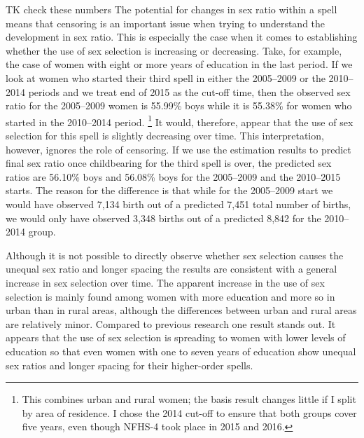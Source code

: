 \documentclass[12pt,letterpaper]{article}
\begin{document}
TK check these numbers
The potential for changes in sex ratio within a spell means
that censoring is an important issue when trying to understand the development
in sex ratio.
This is especially the case when it comes to establishing whether 
the use of sex selection is increasing or decreasing.
Take, for example, the case of women with eight or more years of
education in the last period. 
If we look at women who started their third spell in either the
2005--2009 or the 2010--2014 periods and we treat end of 2015
as the cut-off time, then the observed sex ratio for the 2005--2009
women is 55.99\% boys while it is 55.38\% for women who started 
in the 2010--2014 period.%
\footnote{
This combines urban and rural women; the basis result 
changes little if I split by area of residence.
I chose the 2014 cut-off to ensure that both groups cover 
five years, even though NFHS-4 took place in 2015 and 2016.
}
It would, therefore, appear that the use of sex selection for
this spell is slightly decreasing over time.
This interpretation, however, ignores the role of censoring.
If we use the estimation results to predict final sex ratio
once childbearing for the third spell is over, the predicted
sex ratios are 56.10\% boys and 56.08\% boys for the 
2005--2009 and the 2010--2015 starts.
The reason for the difference is that while for the 
2005--2009 start we would have observed 7,134 birth out
of a predicted 7,451 total number of births, we would
only have observed 3,348 births out of a predicted 8,842
for the 2010--2014 group.

Although it is not possible to directly observe whether sex selection
causes the unequal sex ratio and longer spacing the results are
consistent with a general increase in sex selection over time. 
The apparent increase in the use of sex selection is mainly found among
women with more education and more so in urban than in rural areas,
although the differences between urban and rural areas are relatively
minor. 
Compared to previous research one result stands out. 
It appears that the use of sex selection is spreading to women with lower 
levels of education so that even women with one to seven years of 
education show unequal sex ratios and longer spacing for their higher-order spells.
\end{document}
